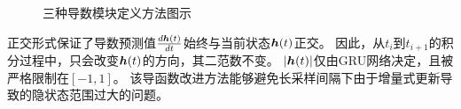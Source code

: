 \begin{figure}[h]
    \centering
    \caption{三种导数模块定义方法图示}
    \label{fig:cells}
\end{figure}
正交形式保证了导数预测值$\frac{d \boldsymbol h(t)}{dt}$始终与当前状态$\boldsymbol h(t)$正交。
因此，从$t_i$到$t_{i+1}$的积分过程中，只会改变$\boldsymbol h(t)$的方向，其二范数不变。
$|\boldsymbol h(t)|$仅由GRU网络决定，且被严格限制在$[-1,1]$。
该导函数改进方法能够避免长采样间隔下由于增量式更新导致的隐状态范围过大的问题。

